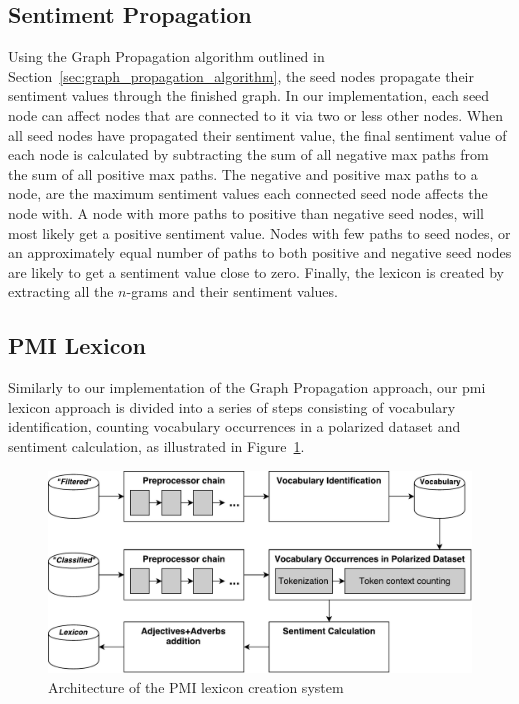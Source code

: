 \subsection*{Sentiment Propagation}
Using the Graph Propagation algorithm outlined in Section~\ref{sec:graph_propagation_algorithm}, the seed nodes propagate their sentiment values through the finished graph. In our implementation, each seed node can affect nodes that are connected to it via two or less other nodes. When all seed nodes have propagated their sentiment value, the final sentiment value of each node is calculated by subtracting the sum of all negative max paths from the sum of all positive max paths. The negative and positive max paths to a node, are the maximum sentiment values each connected seed node affects the node with. A node with more paths to positive than negative seed nodes, will most likely get a positive sentiment value. Nodes with few paths to seed nodes, or an approximately equal number of paths to both positive and negative seed nodes are likely to get a sentiment value close to zero. Finally, the lexicon is created by extracting all the $n$-grams and their sentiment values. 

\subsection{PMI Lexicon}
\label{sec:pmi_lexicon_creation}
Similarly to our implementation of the Graph Propagation approach, our \ac{pmi} lexicon approach is divided into a series of steps consisting of vocabulary identification, counting vocabulary occurrences in a polarized dataset and sentiment calculation, as illustrated in Figure~\ref{fig:creator_overview}.
\begin{figure}[t]
    \centering
    \includegraphics[width=\textwidth]{./figs/creator_overview}
    \caption{Architecture of the PMI lexicon creation system}
    \label{fig:creator_overview}
\end{figure}

